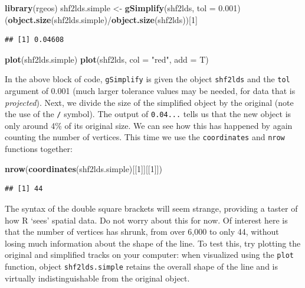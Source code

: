 \documentclass[]{article}
\newenvironment{Shaded}{}{}
\newcommand{\KeywordTok}[1]{\textcolor[rgb]{0.00,0.44,0.13}{\textbf{{#1}}}}
\newcommand{\DataTypeTok}[1]{\textcolor[rgb]{0.56,0.13,0.00}{{#1}}}
\newcommand{\DecValTok}[1]{\textcolor[rgb]{0.25,0.63,0.44}{{#1}}}
\newcommand{\FloatTok}[1]{\textcolor[rgb]{0.25,0.63,0.44}{{#1}}}
\newcommand{\StringTok}[1]{\textcolor[rgb]{0.25,0.44,0.63}{{#1}}}
\newcommand{\NormalTok}[1]{{#1}}
\begin{document}
\begin{Shaded}
\begin{Highlighting}[]
\KeywordTok{library}\NormalTok{(rgeos)}
\NormalTok{shf2lds.simple <- }\KeywordTok{gSimplify}\NormalTok{(shf2lds, }\DataTypeTok{tol =} \FloatTok{0.001}\NormalTok{)}
\NormalTok{(}\KeywordTok{object.size}\NormalTok{(shf2lds.simple)/}\KeywordTok{object.size}\NormalTok{(shf2lds))[}\DecValTok{1}\NormalTok{]}
\end{Highlighting}
\end{Shaded}
\begin{verbatim}
## [1] 0.04608
\end{verbatim}
\begin{Shaded}
\begin{Highlighting}[]
\KeywordTok{plot}\NormalTok{(shf2lds.simple)}
\KeywordTok{plot}\NormalTok{(shf2lds, }\DataTypeTok{col =} \StringTok{"red"}\NormalTok{, }\DataTypeTok{add =} \NormalTok{T)}
\end{Highlighting}
\end{Shaded}
In the above block of code, \texttt{gSimplify} is given the object
\texttt{shf2lds} and the \texttt{tol} argument of 0.001 (much larger
tolerance values may be needed, for data that is \emph{projected}).
Next, we divide the size of the simplified object by the original (note
the use of the \texttt{/} symbol). The output of \texttt{0.04...} tells
us that the new object is only around 4\% of its original size. We can
see how this has happened by again counting the number of vertices. This
time we use the \texttt{coordinates} and \texttt{nrow} functions
together:

\begin{Shaded}
\begin{Highlighting}[]
\KeywordTok{nrow}\NormalTok{(}\KeywordTok{coordinates}\NormalTok{(shf2lds.simple)[[}\DecValTok{1}\NormalTok{]][[}\DecValTok{1}\NormalTok{]])}
\end{Highlighting}
\end{Shaded}
\begin{verbatim}
## [1] 44
\end{verbatim}
The syntax of the double square brackets will seem strange, providing a
taster of how R `sees' spatial data. Do not worry about this for now. Of
interest here is that the number of vertices has shrunk, from over 6,000
to only 44, without losing much information about the shape of the line.
To test this, try plotting the original and simplified tracks on your
computer: when visualized using the \texttt{plot} function, object
\texttt{shf2lds.simple} retains the overall shape of the line and is
virtually indistinguishable from the original object.
\end{document}
